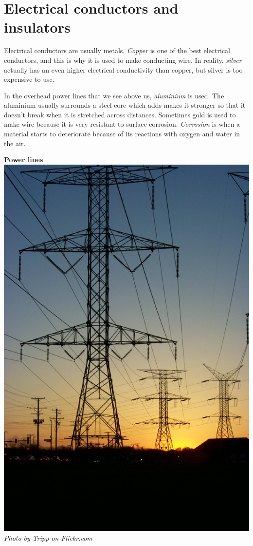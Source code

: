            \section{Electrical conductors and insulators}
            \nopagebreak \vspace{-1cm}
\label{m38706*id66058}
 Electrical conductors are usually metals. \textsl{Copper} is one of the best electrical conductors, and this is why it is used to make conducting wire. In reality, \textsl{silver} actually has an even higher electrical conductivity than copper, but silver is too expensive to use.  \\
\begin{minipage}{0.5\textwidth}
 In the overhead power lines that we see above us, \textsl{aluminium} is used. The aluminium usually surrounds a steel core which adds makes it stronger so that it doesn't break when it is stretched across distances. Sometimes gold is used to make wire because it is very resistant to surface corrosion. \textsl{Corrosion} is when a material starts to deteriorate because of its reactions with oxygen and water in the air.\par 
\end{minipage}
\begin{minipage}{.5\textwidth}
\begin{center}
\textbf{Power lines}\\
 \includegraphics[height=.4\textwidth]{photos/Tripp.jpg}\\
\textit{Photo by Tripp on Flickr.com}
\end{center}
\end{minipage}
